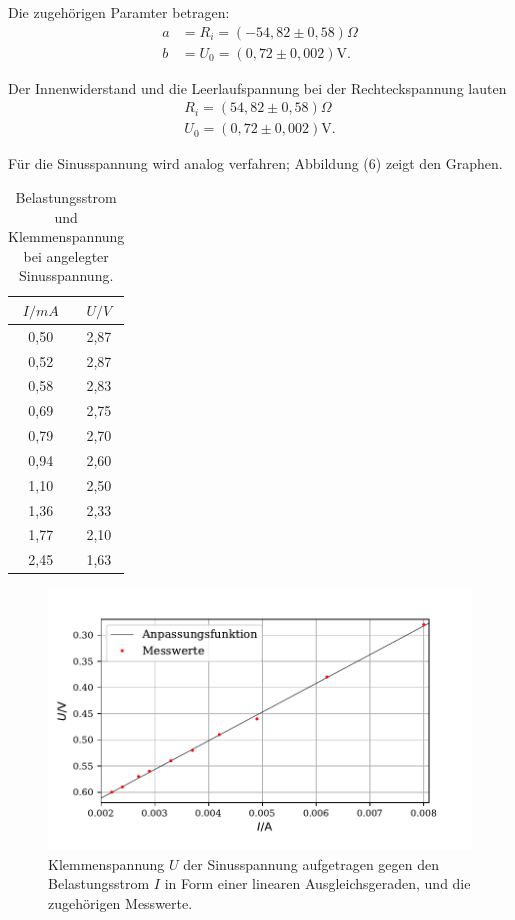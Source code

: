 Die zugehörigen Paramter betragen:
\begin{align*}
a &= R_i = (-54,82 \pm 0,58)\Omega \\
b &= U_0 =  (0,72 \pm 0,002)\si{\volt} .
\end{align*}

Der Innenwiderstand und die Leerlaufspannung bei der Rechteckspannung lauten\begin{align*}
R_i = (54,82 \pm 0,58)\Omega \\
U_0 =  (0,72 \pm 0,002)\si{\volt} .
\end{align*}

Für die Sinusspannung wird analog verfahren; Abbildung (6) zeigt den Graphen.

\begin{table}[H]
  \centering
  \caption{Belastungsstrom und Klemmenspannung bei angelegter Sinusspannung.}
  \begin{tabular}{c c}
    \toprule
     $I/mA$ & $U/V$  \\
    \midrule
    0,50 & 2,87 \\
    0,52 & 2,87 \\
    0,58 & 2,83 \\
    0,69 & 2,75 \\
    0,79 & 2,70 \\
    0,94 & 2,60 \\
    1,10 & 2,50 \\
    1,36 & 2,33 \\
    1,77 & 2,10 \\
    2,45 & 1,63 \\
  \bottomrule
  \end{tabular}
\end{table}

\begin{figure}[H]
  \centering
  \includegraphics{plot3.pdf}
  \caption{Klemmenspannung $U$ der Sinusspannung aufgetragen gegen den Belastungsstrom $I$ in Form einer linearen Ausgleichsgeraden, und die zugehörigen Messwerte.}
  \label{fig:rechteck}
\end{figure}

